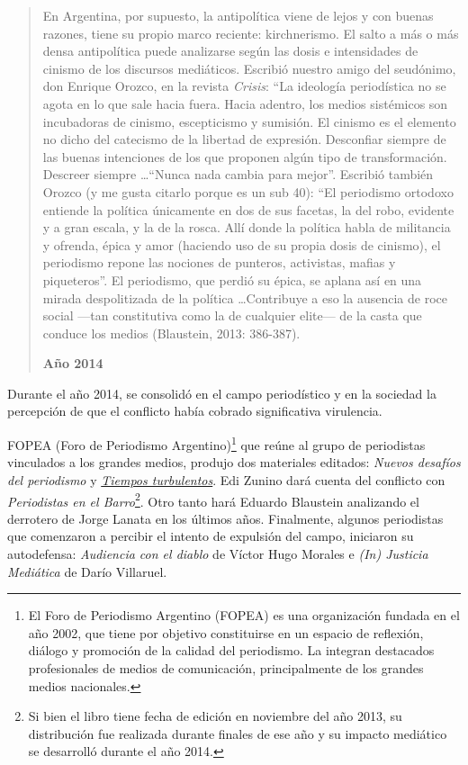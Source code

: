 \begin{quote}
En Argentina, por supuesto, la antipolítica viene de lejos y con buenas razones, tiene su propio marco reciente: kirchnerismo. El salto a más o más densa antipolítica puede analizarse según las dosis e intensidades de cinismo de los discursos mediáticos. Escribió nuestro amigo del seudónimo, don Enrique Orozco, en la revista \emph{Crisis}: ``La ideología periodística no se agota en lo que sale hacia fuera. Hacia adentro, los medios sistémicos son incubadoras de cinismo, escepticismo y sumisión. El cinismo es el elemento no dicho del catecismo de la libertad de expresión. Desconfiar siempre de las buenas intenciones de los que proponen algún tipo de transformación. Descreer siempre \ldots``Nunca nada cambia para mejor''. Escribió también Orozco (y me gusta citarlo porque es un sub 40): ``El periodismo ortodoxo entiende la política únicamente en dos de sus facetas, la del robo, evidente y a gran escala, y la de la rosca. Allí donde la política habla de militancia y ofrenda, épica y amor (haciendo uso de su propia dosis de cinismo), el periodismo repone las nociones de punteros, activistas, mafias y piqueteros''. El periodismo, que perdió su épica, se aplana así en una mirada despolitizada de la política \ldots Contribuye a eso la ausencia de roce social ---tan constitutiva como la de cualquier elite--- de la casta que conduce los medios (Blaustein, 2013: 386-387).

\textbf{Año 2014}
\end{quote}

Durante el año 2014, se consolidó en el campo periodístico y en la sociedad la percepción de que el conflicto había cobrado significativa virulencia.

FOPEA (Foro de Periodismo Argentino)\footnote{El Foro de Periodismo Argentino (FOPEA) es una organización fundada en el año 2002, que tiene por objetivo constituirse en un espacio de reflexión, diálogo y promoción de la calidad del periodismo. La integran destacados profesionales de medios de comunicación, principalmente de los grandes medios nacionales.} que reúne al grupo de periodistas vinculados a los grandes medios, produjo dos materiales editados: \emph{Nuevos desafíos del periodismo} y \href{http://www.cuspide.com/9789871496990/Tiempos+Turbulentos/}{\emph{Tiempos turbulentos}}. Edi Zunino dará cuenta del conflicto con \emph{Periodistas en el Barro}\footnote{Si bien el libro tiene fecha de edición en noviembre del año 2013, su distribución fue realizada durante finales de ese año y su impacto mediático se desarrolló durante el año 2014.}. Otro tanto hará Eduardo Blaustein analizando el derrotero de Jorge Lanata en los últimos años. Finalmente, algunos periodistas que comenzaron a percibir el intento de expulsión del campo, iniciaron su autodefensa: \emph{Audiencia con el diablo} de Víctor Hugo Morales e \emph{(In) Justicia Mediática} de Darío Villaruel.

